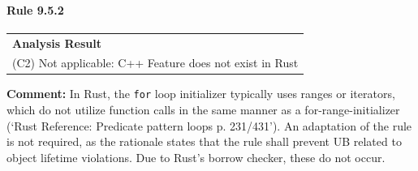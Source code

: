 \paragraph{Rule 9.5.2}
\begin{longtable}{p{13cm}}
\textbf{Analysis Result} \\
(C2) Not applicable: C++ Feature does not exist in Rust \\
\end{longtable}
\textbf{Comment:} In Rust, the \texttt{for} loop initializer typically uses ranges or iterators, which do not utilize function calls in the same manner as a for-range-initializer (`Rust Reference: Predicate pattern loops p. 231/431'). An adaptation of the rule is not required, as the rationale states that the rule shall prevent UB related to object lifetime violations. Due to Rust's borrow checker, these do not occur. \\
